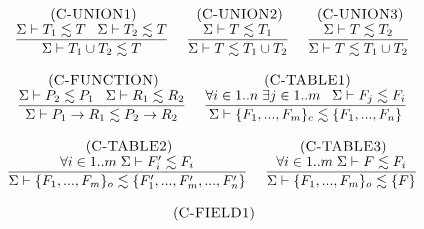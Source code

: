 \begin{figure}[!ht]
\begin{footnotesize}
$$\begin{array}{c}
\begin{array}{c}
\end{array}
\\ \\
\begin{array}{c}
\mylabel{C-UNION1}\\
\dfrac{\senv \vdash T_{1} \lesssim T \;\;\;
       \senv \vdash T_{2} \lesssim T}
      {\senv \vdash T_{1} \cup T_{2} \lesssim T}
\end{array}
\;
\begin{array}{c}
\mylabel{C-UNION2}\\
\dfrac{\senv \vdash T \lesssim T_{1}}
      {\senv \vdash T \lesssim T_{1} \cup T_{2}}
\end{array}
\;
\begin{array}{c}
\mylabel{C-UNION3}\\
\dfrac{\senv \vdash T \lesssim T_{2}}
      {\senv \vdash T \lesssim T_{1} \cup T_{2}}
\end{array}
\\ \\
\begin{array}{c}
\mylabel{C-FUNCTION}\\
\dfrac{\senv \vdash P_{2} \lesssim P_{1} \;\;\;
       \senv \vdash R_{1} \lesssim R_{2}}
      {\senv \vdash P_{1} \rightarrow R_{1} \lesssim P_{2} \rightarrow R_{2}}
\end{array}
\;
\begin{array}{c}
\mylabel{C-TABLE1}\\
\dfrac{\forall i \in 1..n \; \exists j \in 1..m \;\;\;
       \senv \vdash F_{j} \lesssim F_{i}}
      {\senv \vdash \{F_{1}, ..., F_{m}\}_{c} \lesssim \{F_{1}, ..., F_{n}\}}
\end{array}
\\ \\
\begin{array}{c}
\mylabel{C-TABLE2}\\
\dfrac{\forall i \in 1..m \; \senv \vdash F_{i}' \lesssim F_{i}}
      {\senv \vdash \{F_{1}, ..., F_{m}\}_{o} \lesssim \{F_{1}', ..., F_{m}', ..., F_{n}'\}}
\end{array}
\;
\begin{array}{c}
\mylabel{C-TABLE3}\\
\dfrac{\forall i \in 1..m \; \senv \vdash F \lesssim F_{i}}
      {\senv \vdash \{F_{1}, ..., F_{m}\}_{o} \lesssim \{F\}} 
\end{array}
\\ \\
\begin{array}{c}
\mylabel{C-FIELD1}\\

\end{array}
\end{array}$$
\end{footnotesize}
\end{figure}
